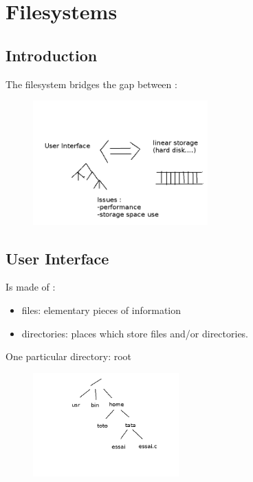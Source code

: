 \chapter{Filesystems}

\section{Introduction}

The filesystem bridges the gap between :
\begin{figure}[h!]
  \begin{center}
    \includegraphics[width=0.6\textwidth]{filesystem.png}
  \end{center}
\end{figure}

\section{User Interface}

Is made of :

\begin{itemize}
  \item files: elementary pieces of information
  \item directories: places which store files and/or directories.
\end{itemize}
  
  One particular directory: root
  \begin{figure}[h!]
  \begin{center}
    \includegraphics[width=0.5\textwidth]{root.png}
  \end{center}
\end{figure}
  
